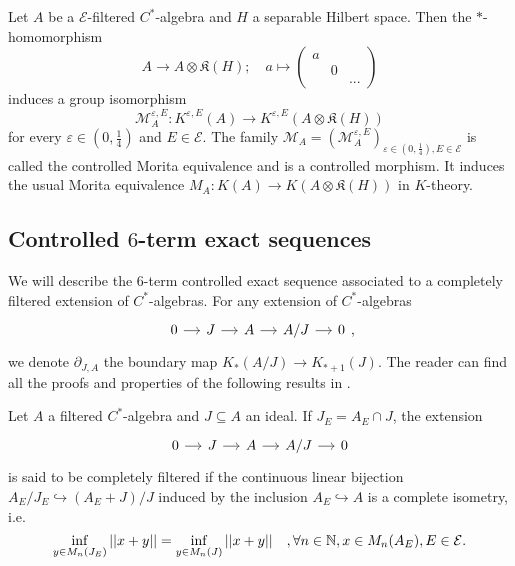\begin{prop}
Let $A$ be a $\mathcal E$-filtered $C^*$-algebra and $H$ a separable Hilbert space. Then the $*$-homomorphism
\[A\rightarrow A\otimes \mathfrak K(H) ; \quad a\mapsto 
\begin{pmatrix}a & & \\  & 0 & \\ & & ... \end{pmatrix}\]
induces a group isomorphism 
\[\mathcal M_A^{\varepsilon,E} : K^{\varepsilon,E}(A)\rightarrow K^{\varepsilon,E}(A\otimes \mathfrak K(H)) \]
for every $\varepsilon\in(0,\frac{1}{4})$ and $E\in\mathcal E$. The family $\mathcal M_A = (\mathcal M_A^{\varepsilon,E} )_{\varepsilon\in(0,\frac{1}{4}),E\in\mathcal E}$ is called the controlled Morita equivalence and is a controlled morphism. It induces the usual Morita equivalence $M_A: K(A)\rightarrow K(A\otimes \mathfrak K(H))$ in $K$-theory. 
\end{prop}

\subsection{Controlled $6$-term exact sequences}

We will describe the $6$-term controlled exact sequence associated to a completely filtered extension of $C^*$-algebras. For any extension of $C^*$-algebras 
\[\begin{tikzcd}[column sep = small]0\arrow{r} & J\arrow{r} & A\arrow{r} & A/J\arrow{r} & 0 \end{tikzcd},\]
we denote $\partial_{J,A}$ the boundary map $K_*(A/J)\rightarrow K_{*+1}(J)$. The reader can find all the proofs and properties of the following results in \cite{OY2}.

\begin{definition}
Let $A$ a filtered $C^*$-algebra and $J\subseteq A$ an ideal. If $J_E = A_E\cap J$, the extension
\[\begin{tikzcd}[column sep = small]0\arrow{r} & J\arrow{r} & A\arrow{r} & A/J\arrow{r} & 0 \end{tikzcd}\]
is said to be completely filtered if the continuous linear bijection $A_E/J_E \hookrightarrow (A_E+J)/J$ induced by the inclusion $A_E\hookrightarrow A$ is a complete isometry, i.e.
\[ \inf_{y\in M_n(J_E)} ||x+y|| = \inf_{y\in M_n(J)} ||x+y||\quad,\forall n\in \mathbb N,x\in M_n(A_E),E\in \mathcal E.\]
\end{definition}

